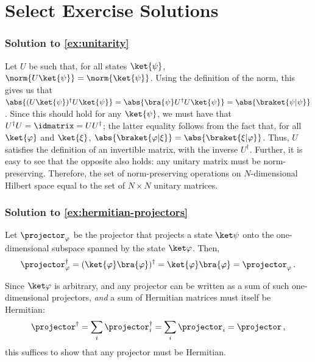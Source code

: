 \section{Select Exercise Solutions}\label{sec:solutions}
  \subsubsection{Solution to \cref{ex:unitarity}}\label{sec:solutions:unitarity}
    Let $U$ be such that, for all
      states $\ket{\psi}$, $\norm{U\ket{\psi}} = \norm{\ket{\psi}}$. Using
      the definition of the norm, this gives us that $\abs{(U\ket{\psi})^\dagger
      U\ket{\psi}} = \abs{\bra{\psi} U^\dagger U \ket{\psi}} =
      \abs{\braket{\psi|\psi}}$. Since this
      should hold for any $\ket{\psi}$, we must have that $U^\dagger U =
      \idmatrix = U U^\dagger$; the latter equality follows from the fact that,
      for all $\ket{\varphi}$ and $\ket{\xi}$, 
      $\abs{\braket{\varphi|\xi}} = \abs{\braket{\xi|\varphi}}$.
      Thus, $U$ satisfies the definition of an invertible matrix, with the
      inverse $U^\dagger$. Further, it is easy to see that the opposite also
      holds: any unitary matrix must be norm-preserving. Therefore, the
      set of norm-preserving operations on $N$-dimensional Hilbert space
      equal to the set of $N\times N$ unitary matrices.

  \subsubsection{Solution to \cref{ex:hermitian-projectors}}\label{sec:solutions:hermitian-projectors}
    Let $\projector_\varphi$ be the projector that
      projects a state $\ket \psi$ onto the one-dimensional subspace spanned
      by the state $\ket\varphi$. Then,
      \[
        \projector^\dagger_\varphi = (\ket{\varphi} \bra{\varphi})^\dagger 
        = \ket{\varphi} \bra{\varphi} = \projector_\varphi\, .
      \]

    \noindent
    Since $\ket\varphi$ is arbitrary, and any projector can be written as a sum of
      such one-dimensional projectors, \emph{and} a sum of Hermitian matrices must itself be Hermitian: 
      \[
        \projector^\dagger = \sum_i \projector^\dagger_i = \sum_i \projector_i = \projector\, ,
      \]
      this suffices to show that any projector must be Hermitian.
